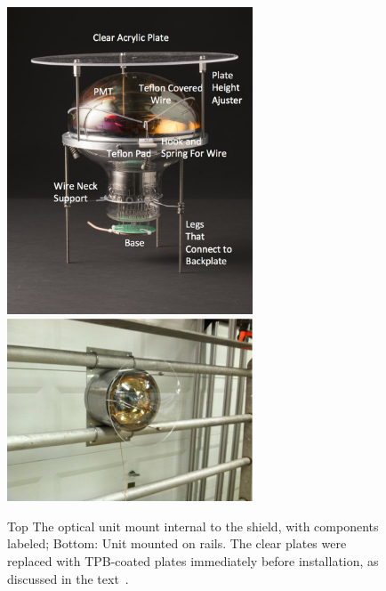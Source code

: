 \begin{figure}
\centering	
\includegraphics[width=0.65\textwidth]{./figures/mountedpmtlabeled.jpg}
\includegraphics[width=0.65\textwidth]{./figures/PMTunit2.pdf}
\caption{Top The optical unit mount internal to the shield, with components labeled; Bottom: Unit mounted on rails.  The clear plates were replaced with TPB-coated plates immediately before \lartpc installation, as discussed in the text~\cite{Briese:2013wua,Katori:2013wqa}.}
\label{fig:unitmodel}
\end{figure}

